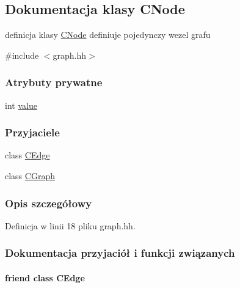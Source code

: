 \hypertarget{class_c_node}{}\subsection{Dokumentacja klasy C\+Node}
\label{class_c_node}


definicja klasy \hyperlink{class_c_node}{C\+Node} definiuje pojedynczy wezel grafu  




{\ttfamily \#include $<$graph.\+hh$>$}

\subsubsection*{Atrybuty prywatne}
\begin{DoxyCompactItemize}
\item 
int \hyperlink{class_c_node_ad08aa99402f6cfbbb9d9580d1f001441}{value}
\end{DoxyCompactItemize}
\subsubsection*{Przyjaciele}
\begin{DoxyCompactItemize}
\item 
class \hyperlink{class_c_node_a0447ad471d74d1dfa4bfd184bccd1b36}{C\+Edge}
\item 
class \hyperlink{class_c_node_a5ba04087b017dfeadb708ba91d6daf1b}{C\+Graph}
\end{DoxyCompactItemize}


\subsubsection{Opis szczegółowy}


Definicja w linii 18 pliku graph.\+hh.



\subsubsection{Dokumentacja przyjaciół i funkcji związanych}
\hypertarget{class_c_node_a0447ad471d74d1dfa4bfd184bccd1b36}{}
\paragraph[{C\+Edge}]{\setlength{\rightskip}{0pt plus 5cm}friend class {\bf C\+Edge}\hspace{0.3cm}{\ttfamily [friend]}}\label{class_c_node_a0447ad471d74d1dfa4bfd184bccd1b36}


